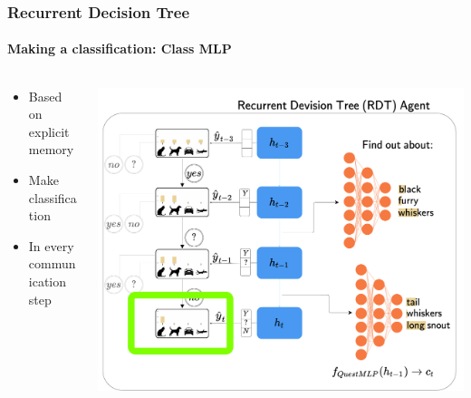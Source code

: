 \documentclass[9pt]{beamer}
\begin{document}
\begin{frame}
\frametitle{Recurrent Decision Tree}
\framesubtitle{Making a classification: Class MLP}
\begin{columns}[T]
\begin{column}{.5\textwidth}
\begin{itemize}
	\item Based on explicit memory
	\item Make classification
	\item In every communication step
\end{itemize}
\end{column}
\begin{column}{.5\textwidth}
\includegraphics[width=\textwidth]{images/urdtc_parts_classMLP.pdf}
\end{column}
\end{columns}
\end{frame}
\end{document}
